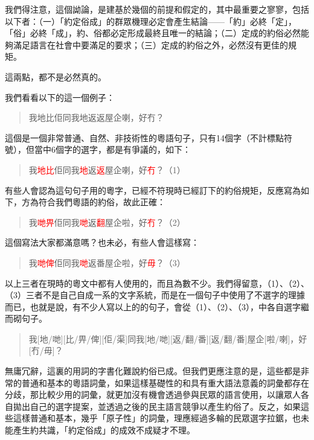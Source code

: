 \documentclass[a5paper, 10pt, openany]{book} %
\begin{document}
我們得注意，這個詏論，是建基於幾個的前提和假定的，其中最重要之寥寥，包括以下者：（一）「約定俗成」的群眾機理必定會產生結論——「約」必終「定」，「俗」必終「成」，約、俗都必定形成最終且唯一的結論；（二）定成的約俗必然能夠滿足語言在社會中要滿足的要求；（三）定成的約俗之外，必然沒有更佳的規矩。

這兩點，都不是必然真的。

我們看看以下的這一個例子：

\begin{quotation}
  \centering
  我地比佢同我地返返屋企喇，好冇？
\end{quotation}

這個是一個非常普通、自然、非技術性的粵語句子，只有14個字（不計標點符號），但當中6個字的選字，都是有爭議的，如下：
\begin{quotation}
  \centering
我\textcolor{red}{地比}佢同我\textcolor{red}{地}返\textcolor{red}{返}屋企喇，好\textcolor{red}{冇}？（1）
\end{quotation}

有些人會認為這句句子用的粵字，已經不符現時已經訂下的約俗規矩，反應寫為如下，方為符合我們粵語的約俗，故此正確：

\begin{quotation}
  
\centering
我\textcolor{red}{哋畀}佢同我\textcolor{red}{哋}返\textcolor{red}{翻}屋企啦，好\textcolor{red}{冇}？（2）
\end{quotation}

這個寫法大家都滿意嗎？也未必，有些人會這樣寫：

\begin{quotation}
  \centering
  我\textcolor{red}{哋俾}佢同我\textcolor{red}{哋}返番屋企啦，好\textcolor{red}{毋}？（3）  
\end{quotation}


以上三者在現時的粵文中都有人使用的，而且為數不少。我們得留意，（1）、（2）、（3）三者不是自己自成一系的文字系統，而是在一個句子中使用了不選字的理據而已，也就是說，有不少人寫以上的的句子，會從（1）、（2）、（3），中各自選字繼而砌句子。

\begin{quotation}
  \centering
  我[地/哋][比/畀/俾][佢/渠]同我[地/哋][返/翻/番][返/翻/番]屋企[啦/喇]，好[冇/毋]？
\end{quotation}

無庸冗辭，這裏的用詞的字書化難說約俗已成。但我們更應注意的是，這些都是非常的普通和基本的粵語詞彙，如果這樣基礎性的和具有重大語法意義的詞彙都存在分歧，那比較少用的詞彙，就更加沒有機會透過參與民眾的語言使用，以讓眾人各自拋出自己的選字提案，並透過之後的民主語言競爭以產生約俗了。反之，如果這些這樣普通和基本，幾乎「原子性」的詞彙，理應經過多輪的民眾選字拉鋸，也未能產生約共識，「約定俗成」的成效不成疑才不理。
\end{document}
